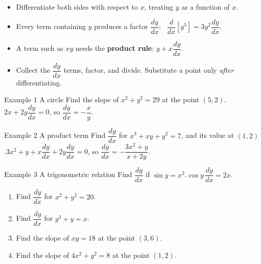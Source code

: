 \documentclass[11pt]{article}
\begin{document}

\begin{ideabox}
\begin{itemize}[leftmargin=*,itemsep=2pt,topsep=2pt]
  \item Differentiate both sides with respect to $x$, treating $y$ as a function of $x$.
  \item Every term containing $y$ produces a factor $\dfrac{dy}{dx}$: \ $\dfrac{d}{dx}\left[y^3\right]=3y^2\dfrac{dy}{dx}$.
  \item A term such as $xy$ needs the \textbf{product rule}: $y+x\dfrac{dy}{dx}$.
  \item Collect the $\dfrac{dy}{dx}$ terms, factor, and divide. Substitute a point only \emph{after} differentiating.
\end{itemize}
\end{ideabox}

\begin{example}{Example 1 \textperiodcentered{} A circle}
Find the slope of $x^2+y^2=29$ at the point $(5,2)$.\soln $2x+2y\dfrac{dy}{dx}=0$, so $\dfrac{dy}{dx}=-\dfrac xy$.
\end{example}

\begin{example}{Example 2 \textperiodcentered{} A product term}
Find $\dfrac{dy}{dx}$ for $x^3+xy+y^2=7$, and its value at $(1,2)$.\soln $3x^2+y+x\dfrac{dy}{dx}+2y\dfrac{dy}{dx}=0$, so $\dfrac{dy}{dx}=-\dfrac{3x^2+y}{x+2y}$.
\end{example}

\begin{example}{Example 3 \textperiodcentered{} A trigonometric relation}
Find $\dfrac{dy}{dx}$ if $\sin y=x^2$.\soln $\cos y\,\dfrac{dy}{dx}=2x$.
\end{example}

\newpage
{}

\begin{enumerate}[leftmargin=*,itemsep=2pt]
  \item Find $\dfrac{dy}{dx}$ for $x^2+y^2=20$.\work{2.3cm}
  \item Find $\dfrac{dy}{dx}$ for $y^3+y=x$.\work{2.3cm}
  \item Find the slope of $xy=18$ at the point $(3,6)$.\work{2.3cm}
  \item Find the slope of $4x^2+y^2=8$ at the point $(1,2)$.\work{2.3cm}
\end{enumerate}
\end{document}
